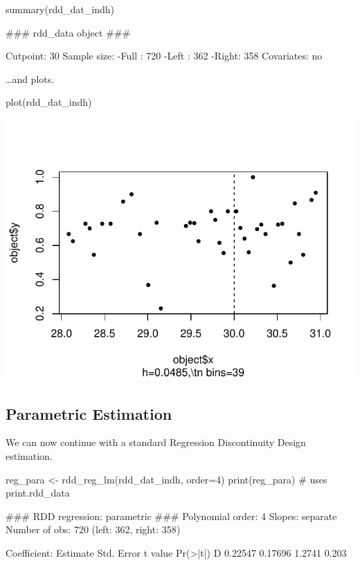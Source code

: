 \documentclass[article]{jss}
\begin{document}
\begin{CodeChunk}
\begin{CodeInput}
summary(rdd_dat_indh)
\end{CodeInput}
\begin{CodeOutput}
### rdd_data object ###

Cutpoint: 30 
Sample size: 
    -Full : 720 
    -Left : 362 
    -Right: 358
Covariates: no 
\end{CodeOutput}
\end{CodeChunk}

\ldots{}and plots.

\begin{CodeChunk}
\begin{CodeInput}
plot(rdd_dat_indh)
\end{CodeInput}


\begin{center}\includegraphics{README_files/figure-latex/plot-1} \end{center}

\end{CodeChunk}

\subsection{Parametric Estimation}\label{parametric-estimation}

We can now continue with a standard Regression Discontinuity Design
estimation.

\begin{CodeChunk}
\begin{CodeInput}
reg_para <- rdd_reg_lm(rdd_dat_indh, order=4)
print(reg_para) # uses print.rdd_data
\end{CodeInput}
\begin{CodeOutput}
### RDD regression: parametric ###
    Polynomial order:  4 
    Slopes:  separate 
    Number of obs: 720 (left: 362, right: 358)

    Coefficient:
  Estimate Std. Error t value Pr(>|t|)
D  0.22547    0.17696  1.2741    0.203
\end{CodeOutput}
\end{CodeChunk}
\end{document}
